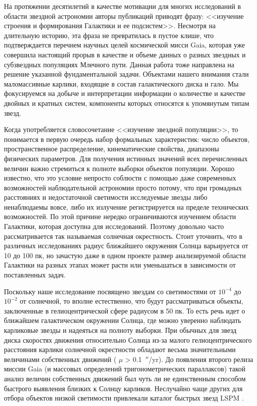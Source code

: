 {\actuality} На протяжении десятилетий в качестве мотивации для многих исследований в области звездной астрономии авторы публикаций приводят фразу: <<изучение строения и формирования Галактики и ее подсистем>>. Несмотря на длительную историю, эта фраза не превратилась в пустое клише, что подтверждается перечнем научных целей космической мисси Gaia, которая уже совершила настоящий прорыв в качестве и объеме данных о разных звездных и субзвездных популяциях Млечного пути. Данная работа тоже направлена на решение указанной фундаментальной задачи. Объектами нашего внимания стали маломассивные карлики, входящие в состав галактического диска и гало. Мы фокусируемся на добыче и интерпретации информации о количестве и качестве двойных и кратных систем, компоненты которых относятся к упомянутым типам звезд.

\ifsynopsis
\else
Когда употребляется словосочетание <<изучение звездной популяции>>, то понимается в первую очередь набор формальных характеристик: число объектов, пространственное распределение, кинематические свойства, диапазоны физических параметров. Для получения истинных значений всех перечисленных величин важно стремиться к полноте выборки объектов популяции. Хорошо известно, что это условие непросто соблюсти с помощью даже современных возможностей наблюдательной астрономии просто потому, что при громадных расстояниях и недостаточной светимости исследуемые звезды либо ненаблюдаемы вовсе, либо их излучение регистрируется на пределе технических возможностей. По этой причине нередко ограничиваются изучением области Галактики, которая доступна для исследований. Поэтому довольно часто рассматривается так называемая солнечная окрестность. Стоит уточнить, что в различных исследованиях радиус ближайшего окружения  Солнца варьируется от 10 до 100 пк, но зачастую даже в одном проекте размер анализируемой области Галактики на разных этапах может расти или уменьшаться в зависимости от поставленных задач.
\fi

Поскольку наше исследование посвящено звездам со светимостями от $10^{-4}$ до $10^{-2}$ от солнечной, то вполне естественно, что будут рассматриваться объекты, заключенные в гелиоцентрической сфере радиусом в 50 пк. То есть речь идет о ближайшем галактическом окружении Солнца, где можно уверенно наблюдать карликовые звезды и надеяться на полноту выборки. При обычных для звезд диска скоростях движения относительно Солнца из-за малого гелиоцентрического расстояния карлики солнечной окрестности обладают весьма значительными величинами собственных движений ( $\mu$ > 0.1~$''$/yr). До появления второго релиза миссии Gaia (и массовых определений тригонометрических параллаксов) такой анализ величин собственных движений был чуть ли не единственным способом быстрого выявления близких к Солнцу карликов. Неслучайно чаще других для отбора объектов низкой светимости привлекали каталог быстрых звезд LSPM \cite{2005AJ....129.1483L}. 
 
